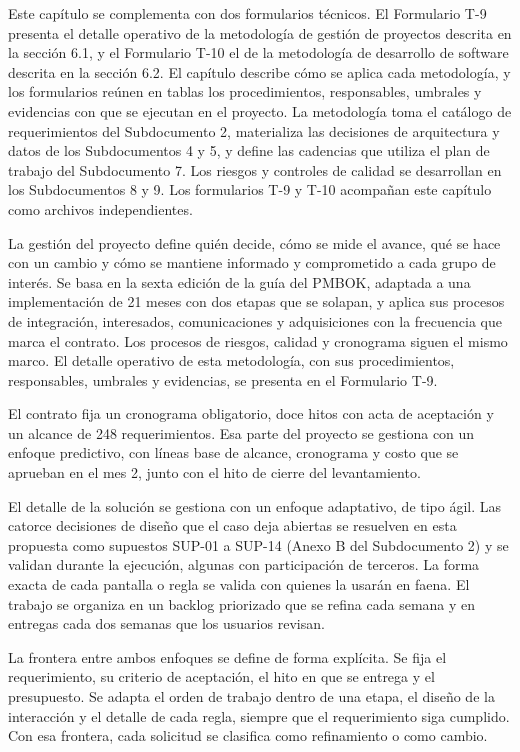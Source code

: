 \documentclass[subdoc]{../../comun/overfore}
\begin{document}
Este capítulo se complementa con dos formularios técnicos. El Formulario T-9 presenta el detalle operativo de la metodología de gestión de proyectos descrita en la sección 6.1, y el Formulario T-10 el de la metodología de desarrollo de software descrita en la sección 6.2. El capítulo describe cómo se aplica cada metodología, y los formularios reúnen en tablas los procedimientos, responsables, umbrales y evidencias con que se ejecutan en el proyecto. La metodología toma el catálogo de requerimientos del Subdocumento 2, materializa las decisiones de arquitectura y datos de los Subdocumentos 4 y 5, y define las cadencias que utiliza el plan de trabajo del Subdocumento 7. Los riesgos y controles de calidad se desarrollan en los Subdocumentos 8 y 9. Los formularios T-9 y T-10 acompañan este capítulo como archivos independientes.

La gestión del proyecto define quién decide, cómo se mide el avance, qué se hace con un cambio y cómo se mantiene informado y comprometido a cada grupo de interés. Se basa en la sexta edición de la guía del PMBOK, adaptada a una implementación de 21 meses con dos etapas que se solapan, y aplica sus procesos de integración, interesados, comunicaciones y adquisiciones con la frecuencia que marca el contrato. Los procesos de riesgos, calidad y cronograma siguen el mismo marco. El detalle operativo de esta metodología, con sus procedimientos, responsables, umbrales y evidencias, se presenta en el Formulario T-9.

El contrato fija un cronograma obligatorio, doce hitos con acta de aceptación y un alcance de 248 requerimientos. Esa parte del proyecto se gestiona con un enfoque predictivo, con líneas base de alcance, cronograma y costo que se aprueban en el mes 2, junto con el hito de cierre del levantamiento.

El detalle de la solución se gestiona con un enfoque adaptativo, de tipo ágil. Las catorce decisiones de diseño que el caso deja abiertas se resuelven en esta propuesta como supuestos SUP-01 a SUP-14 (Anexo B del Subdocumento 2) y se validan durante la ejecución, algunas con participación de terceros. La forma exacta de cada pantalla o regla se valida con quienes la usarán en faena. El trabajo se organiza en un backlog priorizado que se refina cada semana y en entregas cada dos semanas que los usuarios revisan.

La frontera entre ambos enfoques se define de forma explícita. Se fija el requerimiento, su criterio de aceptación, el hito en que se entrega y el presupuesto. Se adapta el orden de trabajo dentro de una etapa, el diseño de la interacción y el detalle de cada regla, siempre que el requerimiento siga cumplido. Con esa frontera, cada solicitud se clasifica como refinamiento o como cambio.
\end{document}
